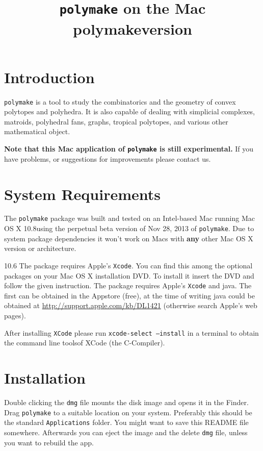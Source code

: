 \documentclass[a4paper]{amsart}
\title{\texttt{polymake} on the Mac\\polymakeversion}
\newcommand{\macversion}{10.8}
\newcommand{\polymakeversion}{ perpetual beta version of Nov 28, 2013\xspace}
\newcommand{\macsix}{10.6}
\newcommand{\polymake}{\texttt{polymake}\xspace}
\begin{document}
\maketitle
\parindent0pt

\section*{Introduction}

\polymake is a tool to study the combinatorics and the geometry of
convex polytopes and polyhedra. It is also capable of dealing with
simplicial complexes, matroids, polyhedral fans, graphs, tropical polytopes, and various other mathematical object.

\textbf{Note that this Mac application of \polymake is still
  experimental.} If you have problems, or suggestions for improvements
please contact us.

\section*{System Requirements}

The \polymake package was built and tested on an Intel-based Mac
running Mac OS X \macversion using the \polymakeversion of
\polymake. Due to system package dependencies it won't work on Macs
with \textbf{any} other Mac OS X version or architecture.

\ifx\macversion\macsix%
The package requires Apple's \texttt{Xcode}.  You can find this among
the optional packages on your Mac OS X installation DVD. To install it
insert the DVD and follow the given instruction.%
\else%
The package requires Apple's \texttt{Xcode} and java. The first can be
obtained in the Appstore (free), at the time of writing java could be
obtained at \url{http://support.apple.com/kb/DL1421} (otherwise search
Apple's web pages).

After installing \texttt{XCode} please run \texttt{xcode-select --install} in a terminal to obtain the command line toolsof XCode (the C-Compiler).
\fi%

\section*{Installation}

Double clicking the \texttt{dmg} file mounts the disk image and opens
it in the Finder. Drag \polymake to a suitable location on your
system. Preferably this should be the standard \texttt{Applications}
folder. You might want to save this README file somewhere. Afterwards
you can eject the image and the delete \texttt{dmg} file, unless you
want to rebuild the app.
\end{document}
